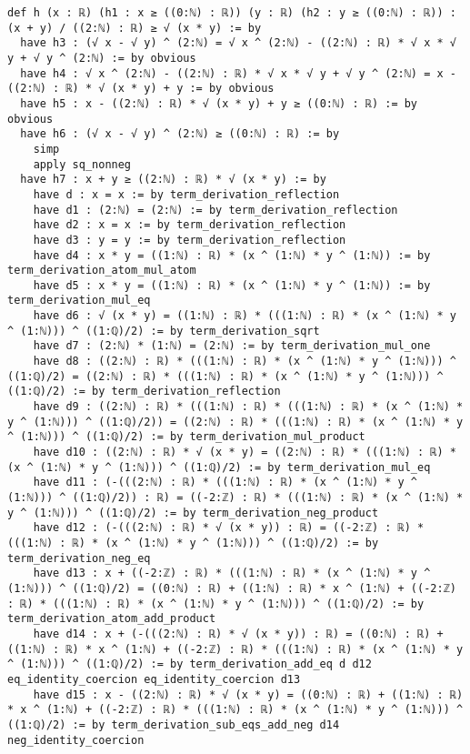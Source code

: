 \documentclass{article}
\begin{document}
\begin{tcolorbox}[colback=white!10, width=\linewidth]
\begin{lstlisting}[language=Lean4]
def h (x : ℝ) (h1 : x ≥ ((0:ℕ) : ℝ)) (y : ℝ) (h2 : y ≥ ((0:ℕ) : ℝ)) : (x + y) / ((2:ℕ) : ℝ) ≥ √ (x * y) := by
  have h3 : (√ x - √ y) ^ (2:ℕ) = √ x ^ (2:ℕ) - ((2:ℕ) : ℝ) * √ x * √ y + √ y ^ (2:ℕ) := by obvious
  have h4 : √ x ^ (2:ℕ) - ((2:ℕ) : ℝ) * √ x * √ y + √ y ^ (2:ℕ) = x - ((2:ℕ) : ℝ) * √ (x * y) + y := by obvious
  have h5 : x - ((2:ℕ) : ℝ) * √ (x * y) + y ≥ ((0:ℕ) : ℝ) := by obvious
  have h6 : (√ x - √ y) ^ (2:ℕ) ≥ ((0:ℕ) : ℝ) := by
    simp
    apply sq_nonneg
  have h7 : x + y ≥ ((2:ℕ) : ℝ) * √ (x * y) := by
    have d : x = x := by term_derivation_reflection
    have d1 : (2:ℕ) = (2:ℕ) := by term_derivation_reflection
    have d2 : x = x := by term_derivation_reflection
    have d3 : y = y := by term_derivation_reflection
    have d4 : x * y = ((1:ℕ) : ℝ) * (x ^ (1:ℕ) * y ^ (1:ℕ)) := by term_derivation_atom_mul_atom
    have d5 : x * y = ((1:ℕ) : ℝ) * (x ^ (1:ℕ) * y ^ (1:ℕ)) := by term_derivation_mul_eq
    have d6 : √ (x * y) = ((1:ℕ) : ℝ) * (((1:ℕ) : ℝ) * (x ^ (1:ℕ) * y ^ (1:ℕ))) ^ ((1:ℚ)/2) := by term_derivation_sqrt
    have d7 : (2:ℕ) * (1:ℕ) = (2:ℕ) := by term_derivation_mul_one
    have d8 : ((2:ℕ) : ℝ) * (((1:ℕ) : ℝ) * (x ^ (1:ℕ) * y ^ (1:ℕ))) ^ ((1:ℚ)/2) = ((2:ℕ) : ℝ) * (((1:ℕ) : ℝ) * (x ^ (1:ℕ) * y ^ (1:ℕ))) ^ ((1:ℚ)/2) := by term_derivation_reflection
    have d9 : ((2:ℕ) : ℝ) * (((1:ℕ) : ℝ) * (((1:ℕ) : ℝ) * (x ^ (1:ℕ) * y ^ (1:ℕ))) ^ ((1:ℚ)/2)) = ((2:ℕ) : ℝ) * (((1:ℕ) : ℝ) * (x ^ (1:ℕ) * y ^ (1:ℕ))) ^ ((1:ℚ)/2) := by term_derivation_mul_product
    have d10 : ((2:ℕ) : ℝ) * √ (x * y) = ((2:ℕ) : ℝ) * (((1:ℕ) : ℝ) * (x ^ (1:ℕ) * y ^ (1:ℕ))) ^ ((1:ℚ)/2) := by term_derivation_mul_eq
    have d11 : (-(((2:ℕ) : ℝ) * (((1:ℕ) : ℝ) * (x ^ (1:ℕ) * y ^ (1:ℕ))) ^ ((1:ℚ)/2)) : ℝ) = ((-2:ℤ) : ℝ) * (((1:ℕ) : ℝ) * (x ^ (1:ℕ) * y ^ (1:ℕ))) ^ ((1:ℚ)/2) := by term_derivation_neg_product
    have d12 : (-(((2:ℕ) : ℝ) * √ (x * y)) : ℝ) = ((-2:ℤ) : ℝ) * (((1:ℕ) : ℝ) * (x ^ (1:ℕ) * y ^ (1:ℕ))) ^ ((1:ℚ)/2) := by term_derivation_neg_eq
    have d13 : x + ((-2:ℤ) : ℝ) * (((1:ℕ) : ℝ) * (x ^ (1:ℕ) * y ^ (1:ℕ))) ^ ((1:ℚ)/2) = ((0:ℕ) : ℝ) + ((1:ℕ) : ℝ) * x ^ (1:ℕ) + ((-2:ℤ) : ℝ) * (((1:ℕ) : ℝ) * (x ^ (1:ℕ) * y ^ (1:ℕ))) ^ ((1:ℚ)/2) := by term_derivation_atom_add_product
    have d14 : x + (-(((2:ℕ) : ℝ) * √ (x * y)) : ℝ) = ((0:ℕ) : ℝ) + ((1:ℕ) : ℝ) * x ^ (1:ℕ) + ((-2:ℤ) : ℝ) * (((1:ℕ) : ℝ) * (x ^ (1:ℕ) * y ^ (1:ℕ))) ^ ((1:ℚ)/2) := by term_derivation_add_eq d d12 eq_identity_coercion eq_identity_coercion d13
    have d15 : x - ((2:ℕ) : ℝ) * √ (x * y) = ((0:ℕ) : ℝ) + ((1:ℕ) : ℝ) * x ^ (1:ℕ) + ((-2:ℤ) : ℝ) * (((1:ℕ) : ℝ) * (x ^ (1:ℕ) * y ^ (1:ℕ))) ^ ((1:ℚ)/2) := by term_derivation_sub_eqs_add_neg d14 neg_identity_coercion

\end{lstlisting}
\end{tcolorbox}
\end{document}
